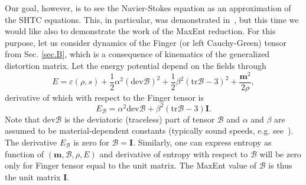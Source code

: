 \documentclass[twoside]{article}
\newcommand{\mm}{{\boldsymbol{m}}}
\newcommand{\BBBB}{{\bm{\mathcal{B}}}}
\newcommand{\BBBBdev}{{\text{dev}\bm{\mathcal{B}}}}
\newcommand{\UM}{\bm{I}}
\newcommand{\IP}[1]{ \textcolor{blue}   {\small\texttt{
\texttt{[image: pin\_small.jpeg]} Ilya: #1}} }
\newcommand{\MP}[1]{ \textcolor{Green}   {\small\texttt{
\texttt{[image: pin\_small.jpeg]} Michal: #1}} }
\newcommand{\eps}{\varepsilon}
\newcommand{\Tr}{\text{tr}}
\begin{document}
Our goal, however, is to see the Navier-Stokes equation as an approximation of 
the SHTC equations. This, in particular, was demonstrated  
in~\cite{HPR2016,DPRZ2016}, but this time we would like also to demonstrate 
the work of the MaxEnt reduction. For this purpose, let us consider 
dynamics of the Finger (or left Cauchy-Green) tensor from Sec. \ref{sec.B}, 
which is a consequence of kinematics of the generalized distortion matrix.
Let the energy potential depend on the fields through
\begin{equation}
E = \eps(\rho,s) + \frac{1}{2}\alpha^2 \left(\BBBBdev\right)^2 + 
\frac{1}{2}\beta^2 
\left(\Tr \BBBB - 3 \right)^2 + 
\frac{\mm^2}{2\rho}, 
\end{equation}
derivative of which with respect to the Finger tensor is 
\begin{equation}
E_{\BBBB} = \alpha^2 \BBBBdev + \beta^2 \left(\Tr \BBBB-3\right) \UM.
\end{equation}
Note that $\BBBBdev$ is the deviatoric (traceless) part of tensor $\BBBB$ and 
$\alpha$ and $\beta$ are assumed to be material-dependent constants (typically 
sound 
speeds, e.g. see~\cite{DPRZ2016}).
The derivative $E_\BBBB$ is zero for $\BBBB=\UM$. Similarly, one can express 
entropy as function of $(\mm,\BBBB,\rho,E)$ and derivative of entropy with 
respect to $\BBBB$ will be zero only for Finger tensor equal to the unit 
matrix. 
The 
MaxEnt value of $\BBBB$ is thus the unit matrix $\UM$. 


\end{document}
